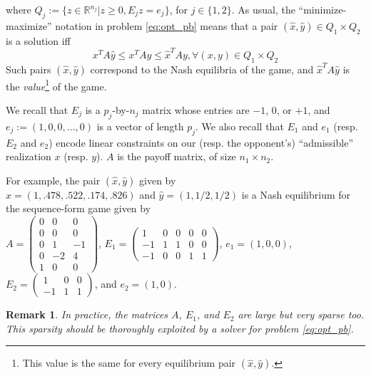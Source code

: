 \documentclass[a4paper,9pt,journal]{IEEEtran}
\newtheorem{remark}{Remark}
\begin{document}
where $Q_j := \{z \in \mathbb{R}^{n_j}|z \ge 0, E_jz=e_j\}$, for $j \in \{1, 2\}$. As usual, the ``minimize-maximize'' notation in problem
\eqref{eq:opt_pb} means that a pair $(\hat{x}, \hat{y}) \in Q_1 \times Q_2$ is a solution iff
\begin{equation}
  x^TA\hat{y} \le x^TAy \le {\hat{x}}^TAy, \forall (x, y) \in Q_1 \times Q_2
\end{equation}
Such pairs $(\hat{x}, \hat{y})$ correspond to the Nash equilibria of the game, and ${\hat{x}}^TA\hat{y}$ is the \textit{value}\footnote{This value is the same for every equilibrium pair $(\hat{x}, \hat{y})$.} of the game.

We recall that $E_j$ is a $p_j$-by-$n_j$ matrix whose
entries are $-1$, $0$, or $+1$, and $e_j := (1, 0, 0, ..., 0)$ is a vector of length $p_j$. We also recall that $E_1$ and $e_1$ (resp. $E_2$ and $e_2$)
encode linear constraints on our (resp. the opponent's)  ``admissible'' realization $x$ (resp. $y$). $A$ is the payoff matrix, of size $n_1 \times n_2$.

For example, the pair $(\hat{x}, \hat{y})$ given by\\
$\hat{x} = (1, .478, .522, .174, .826)$ and
$\hat{y} = (1, 1/2, 1/2)$ is a Nash equilibrium for the sequence-form game given by\\
$A = \left(\begin{array}{ccc}
0 & 0 & 0\\
0 & 0 & 0\\
0 & 1 & -1\\
0 & -2 & 4\\
1 & 0 & 0
\end{array}\right)$, $E_1 = \left(\begin{array}{ccccc}
  1 & 0 & 0 & 0 & 0\\
  -1 & 1 & 1 & 0 & 0\\
  -1 & 0 & 0 & 1 & 1
\end{array}\right)$,
$e_1 = (1, 0, 0)$, $E_2 = \left(\begin{array}{ccc}
  1 & 0 & 0\\
  -1 & 1 & 1
\end{array}\right)$, and $e_2 = (1, 0)$.


\begin{remark}
  In practice, the matrices $A$, $E_1$, and $E_2$ are large but very sparse too.
This sparsity should be thoroughly exploited by a solver for problem \eqref{eq:opt_pb}.
\end{remark}
\end{document}
